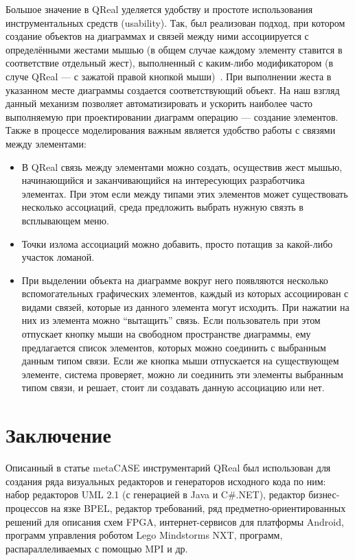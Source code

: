 \documentclass[a4paper]{article}
\begin{document}
Большое значение в QReal уделяется удобству и простоте использования инструментальных средств (usability). Так, был реализован подход, при котором создание объектов на диаграммах и связей между ними ассоциируется с определёнными жестами мышью (в общем случае каждому элементу ставится в соответствие отдельный жест), выполненный с каким-либо модификатором (в случе QReal --- с зажатой правой кнопкой мыши)~\cite{mousegestures}. При выполнении жеста в указанном месте диаграммы создается соответствующий объект. На наш взгляд данный механизм позволяет автоматизировать и ускорить наиболее часто выполняемую при проектировании диаграмм операцию --- создание элементов. Также в процессе моделирования важным является удобство работы с связями между элементами:
\begin{itemize} 
  \item В QReal связь между элементами можно создать, осуществив жест мышью, начинающийся и заканчивающийся на интересующих разработчика элементах. При этом если между типами этих элементов может существовать несколько ассоциаций, среда предложить выбрать нужную связть в всплывающем меню. 
  \item Точки излома ассоциаций можно добавить, просто потащив за какой-либо участок ломаной. 
  \item При выделении объекта на диаграмме вокруг него появляются несколько вспомогательных графических элементов, каждый из которых ассоциирован с видами связей, которые из данного элемента могут исходить. При нажатии на них из элемента можно “вытащить” связь. Если пользователь при этом отпускает кнопку мыши на свободном пространстве диаграммы, ему предлагается список элементов, которых можно соединить с выбранным данным типом связи. Если же кнопка мыши отпускается на существующем элементе, система проверяет, можно ли соединить эти элементы выбранным типом связи, и решает, стоит ли создавать данную ассоциацию или нет. 
\end{itemize}

\section{Заключение}

Описанный в статье metaCASE инструментарий QReal был использован для создания ряда визуальных редакторов и генераторов исходного кода по ним: набор редакторов UML 2.1 (с генерацией в Java и C\#.NET), редактор бизнес-процессов на язке BPEL, редактор требований, ряд предметно-ориентированных решений для описания схем FPGA, интернет-сервисов для платформы Android, программ управления роботом Lego Mindstorms NXT, программ, распараллеливаемых с помощью MPI и др.
\end{document}
